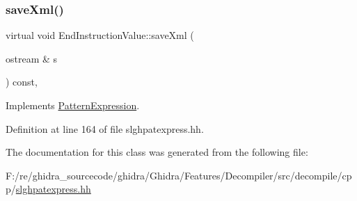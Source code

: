 \subsubsection{\texorpdfstring{saveXml()}{saveXml()}}
{\footnotesize\ttfamily virtual void End\+Instruction\+Value\+::save\+Xml (\begin{DoxyParamCaption}\item[{ostream \&}]{s }\end{DoxyParamCaption}) const\hspace{0.3cm}{\ttfamily [inline]}, {\ttfamily [virtual]}}



Implements \mbox{\hyperlink{class_pattern_expression_a0d9c89ffbf4a22fac68189a845cde92a}{Pattern\+Expression}}.



Definition at line 164 of file slghpatexpress.\+hh.



The documentation for this class was generated from the following file\+:\begin{DoxyCompactItemize}
\item 
F\+:/re/ghidra\+\_\+sourcecode/ghidra/\+Ghidra/\+Features/\+Decompiler/src/decompile/cpp/\mbox{\hyperlink{slghpatexpress_8hh}{slghpatexpress.\+hh}}\end{DoxyCompactItemize}
